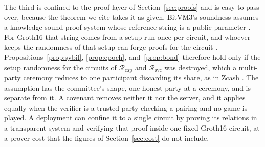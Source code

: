 \documentclass[11pt]{article}
\theoremstyle{plain}
\theoremstyle{definition}
\theoremstyle{remark}
\newcommand{\Rcap}{\mathcal{R}_{\mathrm{cap}}}
\newcommand{\Rsvc}{\mathcal{R}_{\mathrm{svc}}}
\begin{document}
The third is confined to the proof layer of Section~\ref{sec:proofs} and is easy to pass over, because the theorem we cite takes it as given. BitVM3's soundness assumes a knowledge-sound proof system whose reference string is a public parameter \citep{linus2026bitvm3}. For Groth16 that string comes from a setup run once per circuit, and whoever keeps the randomness of that setup can forge proofs for the circuit \citep{groth2016size}. Propositions~\ref{prop:sybil}, \ref{prop:epoch}, and~\ref{prop:bond} therefore hold only if the setup randomness for the circuits of $\Rcap$ and $\Rsvc$ was destroyed, which a multi-party ceremony reduces to one participant discarding its share, as in Zcash \citep{hopwood2016zcash}. The assumption has the committee's shape, one honest party at a ceremony, and is separate from it. A covenant removes neither it nor the server, and it applies equally when the verifier is a trusted party checking a pairing and no game is played. A deployment can confine it to a single circuit by proving its relations in a transparent system and verifying that proof inside one fixed Groth16 circuit, at a prover cost that the figures of Section~\ref{sec:cost} do not include.
\end{document}
